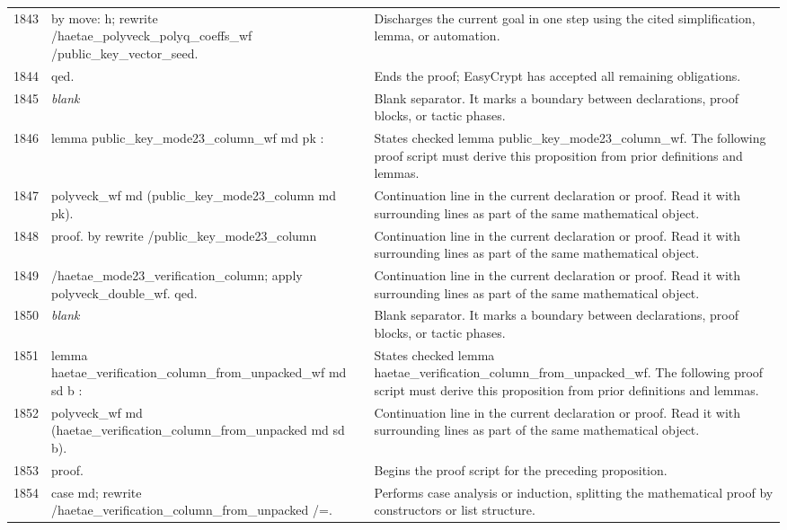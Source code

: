 \documentclass[10pt]{article}
\begin{document}
\begin{longtable}{r L{0.53\textwidth} L{0.37\textwidth}}
1843 & {\ttfamily\scriptsize by move: h; rewrite /haetae\_polyveck\_polyq\_coeffs\_wf /public\_key\_vector\_seed.} & Discharges the current goal in one step using the cited simplification, lemma, or automation. \\
1844 & {\ttfamily\scriptsize qed.} & Ends the proof; EasyCrypt has accepted all remaining obligations. \\
1845 & {\ttfamily\scriptsize \emph{blank}} & Blank separator.  It marks a boundary between declarations, proof blocks, or tactic phases. \\
1846 & {\ttfamily\scriptsize lemma public\_key\_mode23\_column\_wf md pk :} & States checked lemma public\_key\_mode23\_column\_wf.  The following proof script must derive this proposition from prior definitions and lemmas. \\
1847 & {\ttfamily\scriptsize   polyveck\_wf md (public\_key\_mode23\_column md pk).} & Continuation line in the current declaration or proof.  Read it with surrounding lines as part of the same mathematical object. \\
1848 & {\ttfamily\scriptsize proof. by rewrite /public\_key\_mode23\_column} & Continuation line in the current declaration or proof.  Read it with surrounding lines as part of the same mathematical object. \\
1849 & {\ttfamily\scriptsize                   /haetae\_mode23\_verification\_column; apply polyveck\_double\_wf. qed.} & Continuation line in the current declaration or proof.  Read it with surrounding lines as part of the same mathematical object. \\
1850 & {\ttfamily\scriptsize \emph{blank}} & Blank separator.  It marks a boundary between declarations, proof blocks, or tactic phases. \\
1851 & {\ttfamily\scriptsize lemma haetae\_verification\_column\_from\_unpacked\_wf md sd b :} & States checked lemma haetae\_verification\_column\_from\_unpacked\_wf.  The following proof script must derive this proposition from prior definitions and lemmas. \\
1852 & {\ttfamily\scriptsize   polyveck\_wf md (haetae\_verification\_column\_from\_unpacked md sd b).} & Continuation line in the current declaration or proof.  Read it with surrounding lines as part of the same mathematical object. \\
1853 & {\ttfamily\scriptsize proof.} & Begins the proof script for the preceding proposition. \\
1854 & {\ttfamily\scriptsize case md; rewrite /haetae\_verification\_column\_from\_unpacked /=.} & Performs case analysis or induction, splitting the mathematical proof by constructors or list structure. \\

\end{longtable}
\end{document}
